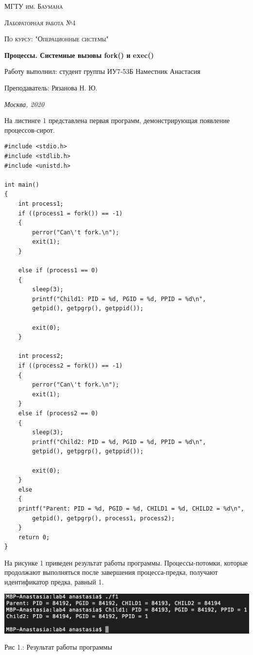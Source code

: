 \documentclass[12pt]{report}
\begin{document}
 
\begin{titlepage}
	\centering
	{\scshape\LARGE МГТУ им. Баумана \par}
	\vspace{3cm}
	{\scshape\Large Лабораторная работа №4\par}
	\vspace{0.5cm}	
	{\scshape\Large По курсу: "Операционные системы"\par}
	\vspace{1.5cm}
	{\huge\bfseries Процессы. Системные вызовы fork() и exec()\par}
	\vspace{2cm}
	\Large Работу выполнил: студент группы ИУ7-53Б Наместник Анастасия\par
	\vspace{0.5cm}
	\Large Преподаватель:  Рязанова Н. Ю.\par

	\vfill
	\large \textit {Москва, 2020} \par
\end{titlepage}

\newpage

На листинге 1 представлена первая программ, демонстрирующая появление процессов-сирот.

\begin{lstlisting}[label=some-code,caption=Задание 1]
#include <stdio.h>
#include <stdlib.h>
#include <unistd.h>

int main()
{
    int process1;
    if ((process1 = fork()) == -1)
    {
        perror("Can\'t fork.\n");
        exit(1);
    }

    else if (process1 == 0)
    {
        sleep(3);
        printf("Child1: PID = %d, PGID = %d, PPID = %d\n",
        getpid(), getpgrp(), getppid());

        exit(0);
    }

    int process2;
    if ((process2 = fork()) == -1)
    {
        perror("Can\'t fork.\n");
        exit(1);
    }
    else if (process2 == 0)
    {
        sleep(3);
        printf("Child2: PID = %d, PGID = %d, PPID = %d\n",
        getpid(), getpgrp(), getppid());

        exit(0);
    }
    else
    {
    printf("Parent: PID = %d, PGID = %d, CHILD1 = %d, CHILD2 = %d\n",
        getpid(), getpgrp(), process1, process2);
    }
    return 0;
}
\end{lstlisting}

На рисунке 1 приведен результат работы программы. Процессы-потомки, которые продолжают выполняться после завершения процесса-предка, получают идентификатор предка, равный 1.
\begin{center}
		\includegraphics[scale=0.8]{pics/proc1.png}
		
			Рис 1.:  Результат работы программы
\end{center}
\end{document}
